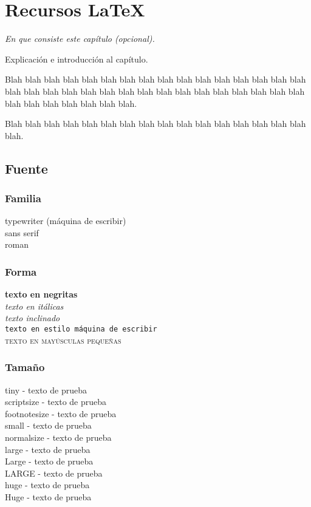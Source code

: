 \chapter{Recursos LaTeX}

\begin{center}
    \textit{En que consiste este capítulo (opcional).}
\end{center}

Explicación e introducción al capítulo. 

Blah blah blah blah blah blah blah blah blah blah blah
blah blah blah blah blah blah blah blah blah blah blah 
blah blah blah blah blah blah blah blah blah blah blah 
blah blah blah blah blah blah.

Blah blah blah blah blah blah blah blah blah blah blah 
blah blah blah blah blah blah.

\section{Fuente}

\subsection{Familia}
{\ttfamily typewriter (máquina de escribir)}\\
{\sffamily sans serif}\\
{\rmfamily roman}

\subsection{Forma}
\textbf{texto en negritas}\\
\textit{texto en itálicas}\\
\textsl{texto inclinado}\\
\texttt{texto en estilo máquina de escribir}\\
\textsc{texto en mayúsculas pequeñas}

\subsection{Tamaño}
{\tiny  tiny - texto de prueba}\\
{\scriptsize  scriptsize - texto de prueba}\\
{\footnotesize  footnotesize - texto de prueba}\\
{\small  small - texto de prueba}\\
{\normalsize  normalsize - texto de prueba}\\
{\large  large - texto de prueba}\\
{\Large  Large - texto de prueba}\\
{\LARGE  LARGE - texto de prueba}\\
{\huge  huge - texto de prueba}\\
{\Huge  Huge - texto de prueba}


